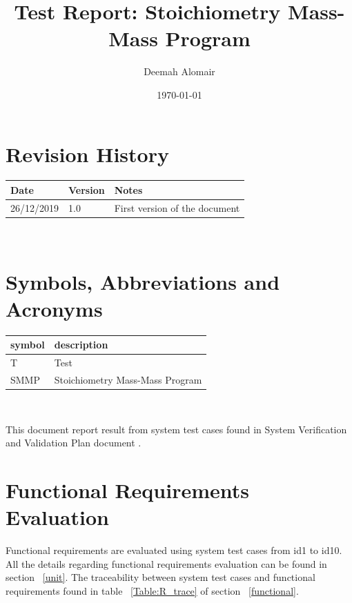 \documentclass[12pt, titlepage]{article}
\begin{document}
\title{Test Report: Stoichiometry Mass-Mass Program} 
\author{Deemah Alomair}
\date{\today}
	
\maketitle


\section{Revision History}

\begin{tabularx}{\textwidth}{p{3cm}p{2cm}X}
\toprule {\bf Date} & {\bf Version} & {\bf Notes}\\
\midrule
26/12/2019 & 1.0 & First version of the document\\
\bottomrule
\end{tabularx}

~\newpage

\section{Symbols, Abbreviations and Acronyms}

\renewcommand{\arraystretch}{1.2}
\begin{tabular}{l l} 
  \toprule		
  \textbf{symbol} & \textbf{description}\\
  \midrule 
  T & Test\\
SMMP & Stoichiometry Mass-Mass Program\\
  \bottomrule
\end{tabular}\\


\newpage

\tableofcontents

\listoftables %

\listoffigures %

\newpage


This document report result from system test cases found in System Verification and Validation Plan document \cite{SystemVnVPlan}.

\section{Functional Requirements Evaluation}

Functional requirements are evaluated using system test cases from id1 to id10. All the details regarding functional requirements evaluation can be found in section ~\ref{unit}. The traceability between system test cases and functional requirements found in table ~\ref{Table:R_trace} of section ~\ref{functional}.
\end{document}
